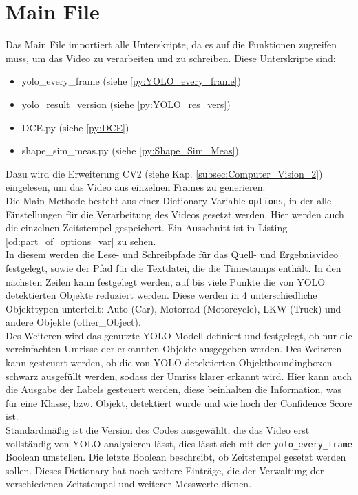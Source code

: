 \section{Main File}
{ 
	Das Main File importiert alle Unterskripte, da es auf die Funktionen zugreifen muss, um das Video zu verarbeiten und zu schreiben. Diese Unterskripte sind: 
	\begin{itemize}
		\item yolo\_every\_frame (siehe \ref{py:YOLO_every_frame})
		\item yolo\_result\_version (siehe \ref{py:YOLO_res_vers})
		\item DCE.py (siehe \ref{py:DCE})
		\item shape\_sim\_meas.py (siehe \ref{py:Shape_Sim_Meas})
	\end{itemize}
	Dazu wird die Erweiterung CV2 (siehe Kap. \ref{subsec:Computer_Vision_2}) eingelesen, um das Video aus einzelnen Frames zu generieren.\\
	Die Main Methode besteht aus einer Dictionary Variable \lstinline|options|, in der alle Einstellungen für die Verarbeitung des Videos gesetzt werden. Hier werden auch die einzelnen Zeitstempel gespeichert. \ifimportant Ein Ausschnitt ist in Listing \ref{cd:part_of_options_var} zu sehen. \fi \\
	In diesem werden die Lese- und Schreibpfade für das Quell- und Ergebnisvideo festgelegt, sowie der Pfad für die Textdatei, die die Timestamps enthält. In den nächsten Zeilen kann festgelegt werden, auf bis viele Punkte die von YOLO detektierten Objekte reduziert werden. Diese werden in 4 unterschiedliche Objekttypen unterteilt: Auto (Car), Motorrad (Motorcycle), LKW (Truck) und andere Objekte (other\_Object). \\
	Des Weiteren wird das genutzte YOLO Modell definiert und festgelegt, ob nur die vereinfachten Umrisse der erkannten Objekte ausgegeben werden. Des Weiteren kann gesteuert werden, ob die von YOLO detektierten Objektboundingboxen schwarz ausgefüllt werden, sodass der Umriss klarer erkannt wird. Hier kann auch die Ausgabe der Labels gesteuert werden, diese beinhalten die Information, was für eine Klasse, bzw. Objekt, detektiert wurde und wie hoch der Confidence Score ist. \\
	Standardmäßig ist die Version des Codes ausgewählt, die das Video erst vollständig von YOLO analysieren lässt, dies lässt sich mit der \lstinline|yolo_every_frame| Boolean umstellen. Die letzte Boolean beschreibt, ob Zeitstempel gesetzt werden sollen. Dieses Dictionary hat noch weitere Einträge, die der Verwaltung der verschiedenen Zeitstempel und weiterer Messwerte dienen. \\
}
